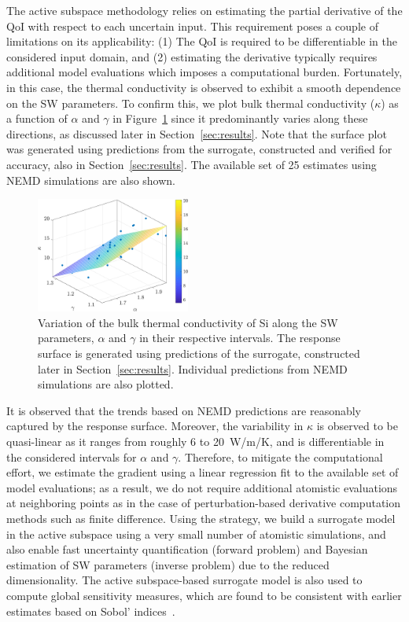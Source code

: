 The active subspace methodology relies on estimating the partial derivative of the QoI 
with respect to each uncertain input. This requirement poses a couple of limitations on its
applicability: (1) The QoI is required to be differentiable in the considered input domain, and (2)
estimating the derivative typically requires additional model evaluations which
imposes a computational burden. Fortunately, in this case,
the thermal conductivity is observed to exhibit a smooth dependence on the SW parameters. 
To confirm this, we plot bulk thermal conductivity ($\kappa$) as a function of $\alpha$
and $\gamma$ in Figure~\ref{fig:kag} since it
predominantly varies along these directions, as discussed later
in Section~\ref{sec:results}. Note that the surface plot was generated using predictions from
the surrogate, constructed and verified for accuracy, also in Section~\ref{sec:results}.
The available set of 25 estimates using NEMD simulations are also shown. 
%
\begin{figure}[htbp]
\begin{center}
\includegraphics[width=0.45\textwidth]{./Figures/k_3D}
\caption{Variation of the bulk thermal conductivity of Si along the SW parameters, $\alpha$ 
and $\gamma$ in their respective intervals. The response surface is generated using predictions
of the surrogate, constructed later in Section~\ref{sec:results}. Individual predictions from NEMD
simulations are also plotted.}
\label{fig:kag}
\end{center}
\end{figure}
%
It is observed that the trends based on NEMD predictions are reasonably captured by
the response surface. Moreover, the variability in $\kappa$ is
observed to be quasi-linear as it ranges from roughly 6 to 20~W/m/K, and is  
differentiable in the considered intervals for $\alpha$ and $\gamma$.
Therefore, to mitigate the computational effort, we estimate the gradient
using a linear regression fit to the available set of model evaluations; as a result, we do not 
require additional atomistic evaluations at neighboring points as in the case of perturbation-based
derivative computation methods such as finite difference. Using the strategy, we build a surrogate
model in the active subspace using a very small number of atomistic simulations, and also enable
fast uncertainty quantification (forward problem) and Bayesian estimation of SW parameters (inverse
problem) due to the reduced dimensionality. The active subspace-based surrogate model is also used
to compute global sensitivity measures, which are found to be consistent with earlier estimates 
based on Sobol' indices~\cite{Vohra:2018b}.

